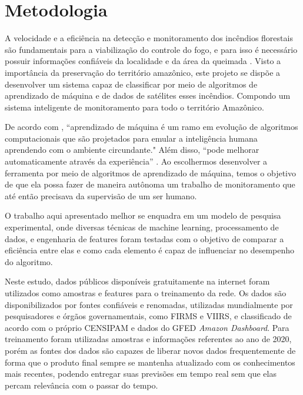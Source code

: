 \chapter{Metodologia}
\label{metodologia}

A velocidade e a eficiência na detecção e monitoramento dos incêndios florestais são 
fundamentais para a viabilização do controle do fogo, e para isso é necessário possuir informações confiáveis da localidade e da área da queimada \cite{batista}. Visto a importância da preservação do território amazônico, este projeto se dispõe a desenvolver um sistema capaz de classificar por meio de algoritmos de aprendizado de máquina e de dados de satélites esses incêndios. Compondo um sistema inteligente de monitoramento para todo o território Amazônico.

De acordo com \cite{naqa}, “aprendizado de máquina é um ramo em evolução de algoritmos computacionais que são projetados para emular a inteligência humana aprendendo com o ambiente circundante."  Além disso, “pode melhorar automaticamente através da experiência” \cite{coogan}. Ao escolhermos desenvolver a ferramenta por meio de algoritmos de aprendizado de máquina, temos o objetivo de que ela possa fazer de maneira autônoma um trabalho de monitoramento que até então precisava da supervisão de um ser humano. %

O trabalho aqui apresentado melhor se enquadra em um modelo de pesquisa experimental, onde diversas técnicas de machine learning, processamento de dados, e engenharia de features foram testadas com o objetivo de comparar a eficiência entre elas e como cada elemento é capaz de influenciar no desempenho do algoritmo.

Neste estudo, dados públicos disponíveis gratuitamente na internet foram utilizados como amostras e features para o treinamento da rede. Os dados são disponibilizados por fontes confiáveis e renomadas, utilizadas mundialmente por pesquisadores e órgãos governamentais, como FIRMS e VIIRS, e classificado de acordo com o próprio CENSIPAM e dados do GFED \textit{Amazon Dashboard}. Para treinamento foram utilizadas amostras e informações referentes ao ano de 2020, porém as fontes dos dados são capazes de liberar novos dados frequentemente de forma que o produto final sempre se mantenha atualizado com os conhecimentos mais recentes, podendo entregar suas previsões em tempo real sem que elas percam relevância com o passar do tempo.

